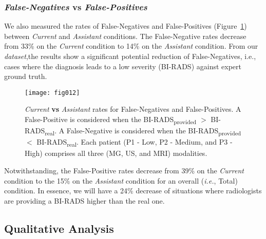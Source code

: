\subsubsection{{\it False-Negatives} vs {\it False-Positives}}

We also measured the rates of False-Negatives and False-Positives (Figure~\ref{fig:fig012}) between {\it Current} and {\it Assistant} conditions. The False-Negative rates decrease from 33\% on the {\it Current} condition to 14\% on the {\it Assistant} condition.
From our {\it dataset},\footnotemark[14] the results show a significant potential reduction of False-Negatives, i.e., cases where the diagnosis leads to a low severity (BI-RADS) against expert ground truth.


\begin{figure}[ht]
\centering
\texttt{[image: fig012]}
\caption{{\it Current} {\bf vs} {\it Assistant} rates for False-Negatives and False-Positives. A False-Positive is considered when the BI-RADS\textsubscript{provided} $>$ BI-RADS\textsubscript{real}. A False-Negative is considered when the BI-RADS\textsubscript{provided} $<$ BI-RADS\textsubscript{real}. Each patient (P1 - Low, P2 - Medium, and P3 - High) comprises all three (MG, US, and MRI) modalities.}
\label{fig:fig012}
\end{figure}

Notwithstanding, the False-Positive rates decrease from 39\% on the {\it Current} condition to the 15\% on the {\it Assistant} condition for an overall ({\it i.e.}, Total) condition.
In essence, we will have a 24\% decrease of situations where radiologists are providing a BI-RADS higher than the real one.

\subsection{Qualitative Analysis}
\label{sec:qualitative}

